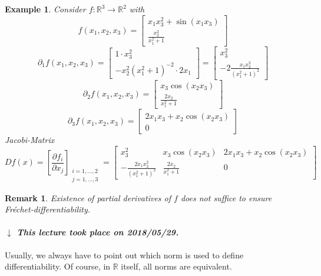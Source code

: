 \documentclass{article}
\newtheorem{example}{Example}  \numberwithin{example}{section}
\newtheorem{remark}{Remark}  \numberwithin{remark}{section}
\newcommand{\dateref}[1]{%
  \begin{mdframed}[backgroundcolor=gray!10,innerbottommargin=0pt,innertopmargin=0pt]
    \paragraph{\textit{$\downarrow$ This lecture took place on #1.}}%
  \end{mdframed}%
}
\begin{document}
\begin{example}
  Consider $f: \mathbb R^3 \to \mathbb R^2$ with
  \[
    f(x_1, x_2, x_3) = \begin{bmatrix}
      x_1 x_3^2 + \sin(x_1 x_3) \\
      \frac{x_2^2}{x_1^2 + 1}
    \end{bmatrix}
  \]
  \[
    \partial_1 f(x_1, x_2, x_3) = \begin{bmatrix}
      1 \cdot x_3^2 \\
      -x_2^2 (x_1^2 + 1)^{-2} \cdot 2x_1
    \end{bmatrix} = \begin{bmatrix}
      x_3^2 \\
      -2 \frac{x_1 x_2^2}{(x_1^2 + 1)^2}
    \end{bmatrix}
  \] \[
    \partial_2 f(x_1, x_2, x_3) = \begin{bmatrix}
      x_3 \cos(x_2 x_3) \\
      \frac{2x_2}{x_1^2 + 1}
    \end{bmatrix}
  \] \[
    \partial_3 f(x_1, x_2, x_3) = \begin{bmatrix}
      2x_1 x_3 + x_2 \cos(x_2 x_3) \\
      0
    \end{bmatrix}
  \]
  Jacobi-Matrix
  \[
    Df(x)
    = \left[\frac{\partial f_i}{\partial x_j}\right]_{\substack{i = 1,\dots,2 \\ j = 1,\dots,3}}
    = \begin{bmatrix}
      x_3^2 & x_3 \cos(x_2 x_3) & 2 x_1 x_3 + x_2 \cos(x_2 x_3) \\
      - \frac{2x_1 x_2^2}{(x_1^2 + 1)^2} & \frac{2x_2}{x_1^2 + 1} & 0
    \end{bmatrix}
  \]
\end{example}

\begin{remark}
  Existence of partial derivatives of $f$ does not suffice to ensure Fr\'echet-differentiability.
\end{remark}

\dateref{2018/05/29}

Usually, we always have to point out which norm is used to define differentiability.
Of course, in $\mathbb R$ itself, all norms are equivalent.
\end{document}
